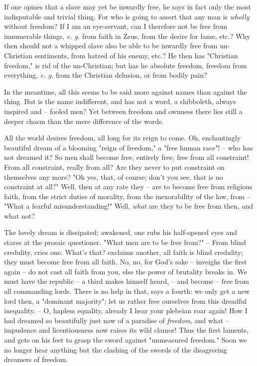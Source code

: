 \documentclass[a4paper]{book}
\begin{document}
If one opines that a slave may yet be inwardly free, he says in fact only the 
most indisputable and trivial thing. For who is going to assert that any man 
is \textit{wholly} without freedom? If I am an eye-servant, can I therefore 
not be free from innumerable things, \textit{e. g.} from faith in Zeus, from 
the desire for fame, etc.? Why then should not a whipped slave also be able to 
be inwardly free from un-Christian sentiments, from hatred of his enemy, etc.? 
He then has "{}Christian freedom,"{} is rid of the un-Christian; but has he 
absolute freedom, freedom from everything, \textit{e. g.} from the Christian 
delusion, or from bodily pain?

In the meantime, all this seems to be said more against names than against the 
thing. But is the name indifferent, and has not a word, a shibboleth, always 
inspired and -- fooled men? Yet between freedom and ownness there lies still a 
deeper chasm than the mere difference of the words.

All the world desires freedom, all long for its reign to come. Oh, 
enchantingly beautiful dream of a blooming "{}reign of freedom,"{} a "{}free 
human race"{}! -- who has not dreamed it? So men shall become free, entirely 
free, free from all constraint! From all constraint, really from all? Are they 
never to put constraint on themselves any more? "{}Oh yes, that, of course; 
don't you see, that is no constraint at all?"{} Well, then at any rate they -- 
are to become free from religious faith, from the strict duties of morality, 
from the inexorability of the law, from -- "{}What a fearful 
misunderstanding!"{} Well, \textit{what} are they to be free from then, and 
what not?

The lovely dream is dissipated; awakened, one rubs his half-opened eyes and 
stares at the prosaic questioner. "{}What men are to be free from?"{} -- From 
blind credulity, cries one. What's that? exclaims another, all faith is blind 
credulity; they must become free from all faith. No, no, for God's sake -- 
inveighs the first again -- do not cast all faith from you, else the power of 
brutality breaks in. We must have the republic -- a third makes himself heard, 
-- and become -- free from all commanding lords. There is no help in that, 
says a fourth: we only get a new lord then, a "{}dominant majority"{}; let us 
rather free ourselves from this dreadful inequality. -- O, hapless equality, 
already I hear your plebeian roar again! How I had dreamed so beautifully just 
now of a paradise of \textit{freedom}, and what -- impudence and 
licentiousness now raises its wild clamor! Thus the first laments, and gets on 
his feet to grasp the sword against "{}unmeasured freedom."{} Soon we no 
longer hear anything but the clashing of the swords of the disagreeing 
dreamers of freedom.
\end{document}
